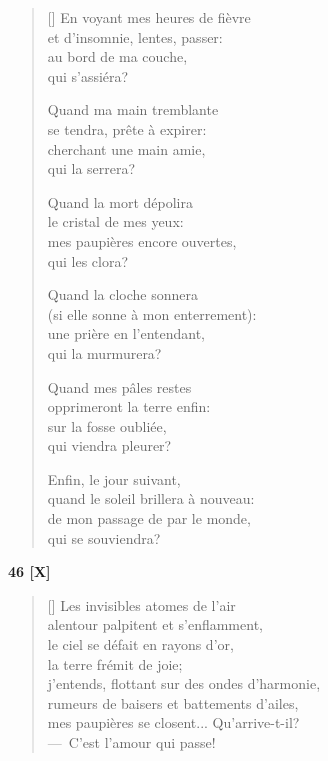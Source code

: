 \documentclass[a4paper,12pt]{book}
\begin{document}
\settowidth{\versewidth}{quand le soleil brillera à nouveau:}

\begin{verse}[\versewidth]
  En voyant mes heures de fièvre \\
  et d'insomnie, lentes, passer: \\
  au bord de ma couche, \\
  qui s'assiéra?

  Quand ma main tremblante \\
  se tendra, prête à expirer: \\
  cherchant une main amie, \\
  qui la serrera?

  Quand la mort dépolira \\
  le cristal de mes yeux: \\
  mes paupières encore ouvertes, \\
  qui les clora?

  Quand la cloche sonnera \\
  (si elle sonne à mon enterrement): \\
  une prière en l'entendant, \\
  qui la murmurera?

  Quand mes pâles restes \\
  opprimeront la terre enfin: \\
  sur la fosse oubliée, \\
  qui viendra pleurer?

  Enfin, le jour suivant, \\
  quand le soleil brillera à nouveau: \\
  de mon passage de par le monde, \\
  qui se souviendra?
\end{verse}

\bigskip

\begin{center}
  \textbf{46 [X]}
\end{center}

\settowidth{\versewidth}{Dis-moi...? Silence! C'est l'amour qui passe!}

\begin{verse}[\versewidth]
  Les invisibles atomes de l'air \\
  alentour palpitent et s'enflamment, \\
  le ciel se défait en rayons d'or, \\
  la terre frémit de joie; \\
  j'entends, flottant sur des ondes d'harmonie, \\
  rumeurs de baisers et battements d'ailes, \\
  mes paupières se closent... Qu'arrive-t-il? \\
  ---~C'est l'amour qui passe!
\end{verse}
\end{document}
